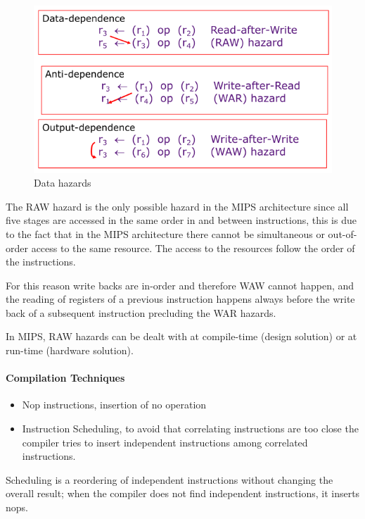 \begin{figure}[h]
    \centering
    \includegraphics[scale = 0.4]{images/data-hazards-1}
    \caption{Data hazards}
    \label{fig:data-hazards}
\end{figure}


The RAW hazard is the only possible hazard in the MIPS architecture since all five stages are accessed in the
same order in and between instructions, this is due to the fact that in the MIPS architecture there cannot
be simultaneous or out-of-order access to the same resource.
The access to the resources follow the order of the instructions.

For this reason write backs are in-order and therefore WAW cannot happen, and the reading of registers of a previous
instruction happens always before the write back of a subsequent instruction precluding the WAR hazards.

In MIPS, RAW hazards can be dealt with at compile-time (design solution) or at run-time (hardware solution).

\paragraph{Compilation Techniques}
\begin{itemize}
    \item[\textrightarrow] Nop instructions, insertion of no operation
    \item[\textrightarrow] Instruction Scheduling, to avoid that correlating instructions are too close the compiler
    tries to insert independent instructions among correlated instructions.
\end{itemize}
Scheduling is a reordering of independent instructions without changing the overall result;
when the compiler does not find independent instructions, it inserts nops.

